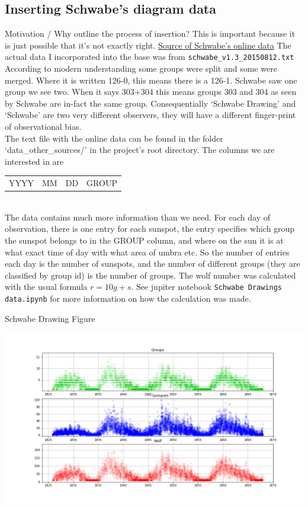 \documentclass[12pt]{article}
\begin{document}
\subsection{Inserting Schwabe's diagram data}
Motivation / Why outline the process of insertion? This is important because it is just possible that it's not exactly right. \href{https://www.aip.de/Members/rarlt/sunspots/schwabe}{Source of Schwabe's online data} The actual data I incorporated into the base was from \texttt{schwabe\_v1.3\_20150812.txt}\\

According to modern understanding some groups were split and some were merged. Where it is written 126-0, this means there is a 126-1. Schwabe saw one group we see two. When it says 303+304 this means groups 303 and 304 as seen by Schwabe are in-fact the same group. Consequentially `Schwabe Drawing' and `Schwabe' are two very different observers, they will have a different finger-print of observational bias.\\

The text file with the online data can be found in the folder `data\_other\_sources/' in the project's root directory. The columns we are interested in are \\

{\centering
\begin{tabular}{c|c|c|c}
    YYYY & MM & DD & GROUP 
\end{tabular}
\par}\\

The data contains much more information than we need. For each day of observation, there is one entry for each sunspot, the entry specifies which group the sunspot belongs to in the GROUP column, and where on the sun it is at what exact time of day with what area of umbra etc. So the number of entries each day is the number of sunspots, and the number of different groups (they are classified by group id) is the number of groups. The wolf number was calculated with the usual formula $r = 10g + s$. See jupiter notebook \texttt{Schwabe Drawings data.ipynb} for more information on how the calculation was made. \\

{\centering
\caption{Schwabe Drawing Figure}
\includegraphics[width=\linewidth]{Schwabe-Drawing.png}
\label{fig:schwabe drawing}
\par}
\end{document}
